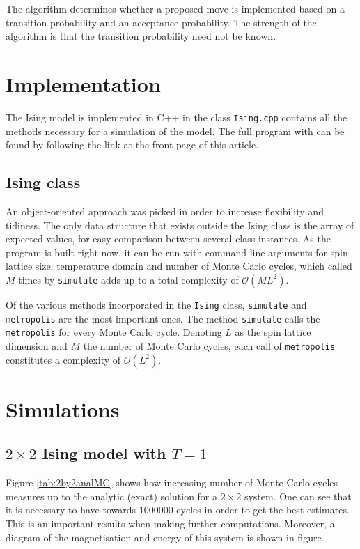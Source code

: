 \documentclass[10pt,a4paper]{amsart}
\begin{document}
The algorithm determines whether a proposed move is implemented based on a transition probability and an acceptance probability. The strength of the algorithm is that the transition probability need not be known. 

\section{Implementation}
The Ising model is implemented in C++ in the class \lstinline|Ising.cpp| contains all the methods necessary for a simulation of the model. The full program with can be found by following the link at the front page of this article.

\subsection{Ising class}
An object-oriented approach was picked in order to increase flexibility and tidiness. The only data structure that exists outside the Ising class is the array of expected values, for easy comparison between several class instances. As the program is built right now, it can be run with command line arguments for spin lattice size, temperature domain and number of Monte Carlo cycles, which called $M$ times by \lstinline|simulate| adds up to a total complexity of $\mathcal{O}(ML^2)$.

Of the various methods incorporated in the \lstinline|Ising| class, \lstinline|simulate| and \lstinline|metropolis| are the most important ones. The method \lstinline|simulate| calls the \lstinline|metropolis| for every Monte Carlo cycle. Denoting $L$ as the spin lattice dimension and $M$ the number of Monte Carlo cycles, each call of \lstinline|metropolis| constitutes a complexity of $\mathcal{O}(L^2)$.

\section{Simulations}

\subsection{$2\times2$ Ising model with $T=1$}
Figure \ref{tab:2by2analMC} shows how increasing number of Monte Carlo cycles measures up to the analytic (exact) solution for a $2\times2$ system. One can see that it is necessary to have towards $1000000$ cycles in order to get the best estimates. This is an important results when making further computations. Moreover, a diagram of the magnetisation and energy of this system is shown in figure
\end{document}
